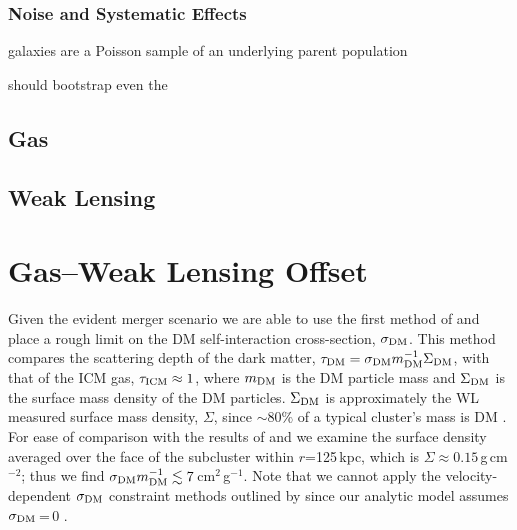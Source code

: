 \subsubsection{Noise and Systematic Effects}

galaxies are a Poisson sample of an underlying parent population

should bootstrap even the 

\subsection{Gas}

\subsection{Weak Lensing}


\section{Gas--Weak Lensing Offset}

Given the evident merger scenario we are able to use the first method of \citet{Markevitch:2004dl} and place a rough limit on the DM self-interaction cross-section, $\sigma_{\rm DM}$.
This method compares the scattering depth of the dark matter, $\tau_{\rm DM}=\sigma_{\rm DM}m^{-1}_{\rm DM} \Sigma_{\rm DM}$, with that of the ICM gas, $\tau_{\rm ICM}\approx 1$, where $m_{\rm DM}$ is the DM particle mass and $\Sigma_{\rm DM}$ is the surface mass density of the DM particles.
$\Sigma_{\rm DM}$ is approximately the WL measured surface mass density, $\Sigma$, since $\sim80\%$ of a typical cluster's mass is DM \citep{Diaferio:2008js}.
For ease of comparison with the results of \citet{Markevitch:2004dl} and \citet{Merten:2011gu} we examine the surface density averaged over the face of the subcluster within $r$=125\,kpc, which is $\Sigma\approx0.15$\,g\,cm$^{-2}$; thus we find $\sigma_{\rm DM} m_{\rm DM}^{-1} \lesssim 7$\,cm$^2$\,g$^{-1}$.  
Note that we cannot apply the velocity-dependent $\sigma_{\rm DM}$ constraint methods outlined by \citet{Markevitch:2004dl} since our analytic model assumes $\sigma_{\rm DM}$\,=\,0 \citep{Dawson:2012dl, Dawson:2012ub}.

